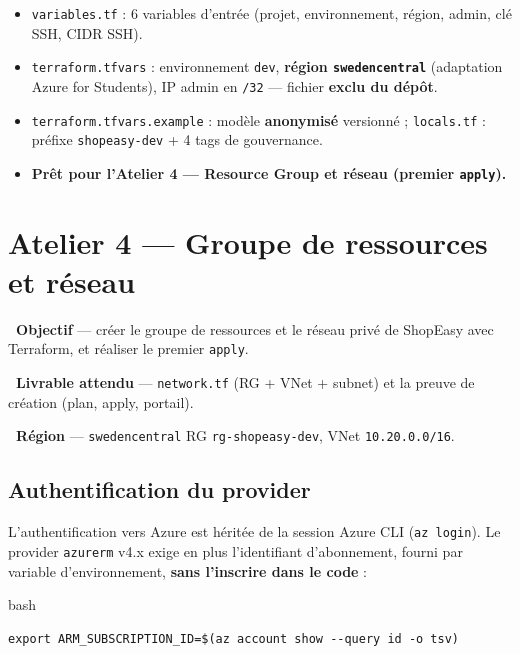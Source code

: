 \documentclass[11pt,a4paper]{article}
\newcommand{\emo}[1]{\raisebox{-0.14em}{\twemoji{#1}}}
\newcommand{\eTarget}{\emo{1f3af}}
\newcommand{\ePackage}{\emo{1f4e6}}
\newcommand{\eGlobe}{\emo{1f310}}
\newcommand{\code}[1]{\texttt{#1}}
\begin{document}
\begin{etatbox}
\begin{itemize}
  \item \code{variables.tf} : 6 variables d'entrée (projet, environnement, région, admin, clé SSH, CIDR SSH).
  \item \code{terraform.tfvars} : environnement \code{dev}, \textbf{région \code{swedencentral}} (adaptation Azure for Students), IP admin en \code{/32} — fichier \textbf{exclu du dépôt}.
  \item \code{terraform.tfvars.example} : modèle \textbf{anonymisé} versionné ; \code{locals.tf} : préfixe \code{shopeasy-dev} + 4 tags de gouvernance.
  \item \textbf{Prêt pour l'Atelier 4 — Resource Group et réseau (premier \code{apply}).}
\end{itemize}
\end{etatbox}


\section{Atelier 4 — Groupe de ressources et réseau}

\begin{fiche}
\textbf{\eTarget~Objectif} — créer le groupe de ressources et le réseau privé de ShopEasy avec Terraform, et réaliser le premier \code{apply}.

\textbf{\ePackage~Livrable attendu} — \code{network.tf} (RG + VNet + subnet) et la preuve de création (plan, apply, portail).

\textbf{\eGlobe~Région} — \code{swedencentral} \quad\textbullet\quad RG \code{rg-shopeasy-dev}, VNet \code{10.20.0.0/16}.
\end{fiche}

\subsection{Authentification du provider}
L'authentification vers Azure est héritée de la session Azure CLI (\code{az login}). Le provider
\code{azurerm} v4.x exige en plus l'identifiant d'abonnement, fourni par variable d'environnement, \textbf{sans
l'inscrire dans le code} :
\begin{codebox}{bash}
\begin{Verbatim}
export ARM_SUBSCRIPTION_ID=$(az account show --query id -o tsv)
\end{Verbatim}
\end{codebox}
\end{document}
